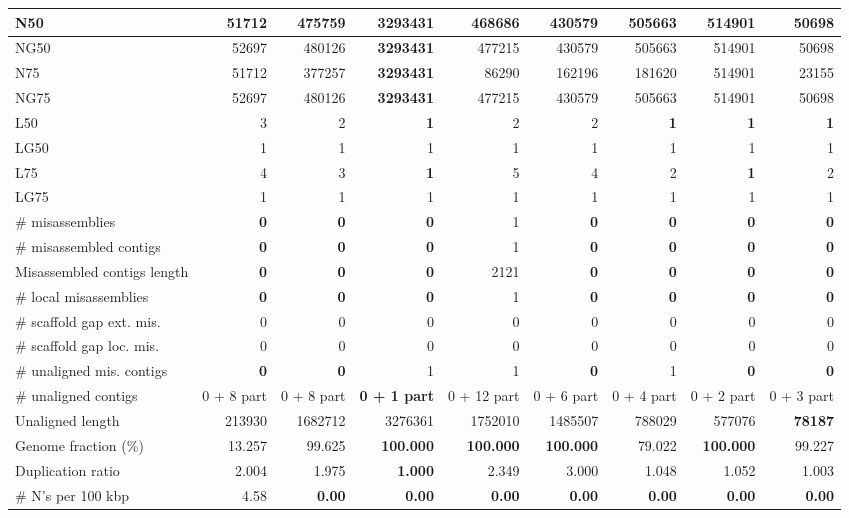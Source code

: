 \documentclass[12pt,a4paper]{article}
\begin{document}
\begin{table}[ht]
\begin{center}
\begin{tabular}{|l*{8}{|r}|}
N50 & 51712 & 475759 & {\bf 3293431} & 468686 & 430579 & 505663 & 514901 & 50698 \\ \hline
NG50 & 52697 & 480126 & {\bf 3293431} & 477215 & 430579 & 505663 & 514901 & 50698 \\ \hline
N75 & 51712 & 377257 & {\bf 3293431} & 86290 & 162196 & 181620 & 514901 & 23155 \\ \hline
NG75 & 52697 & 480126 & {\bf 3293431} & 477215 & 430579 & 505663 & 514901 & 50698 \\ \hline
L50 & 3 & 2 & {\bf 1} & 2 & 2 & {\bf 1} & {\bf 1} & {\bf 1} \\ \hline
LG50 & 1 & 1 & 1 & 1 & 1 & 1 & 1 & 1 \\ \hline
L75 & 4 & 3 & {\bf 1} & 5 & 4 & 2 & {\bf 1} & 2 \\ \hline
LG75 & 1 & 1 & 1 & 1 & 1 & 1 & 1 & 1 \\ \hline
\# misassemblies & {\bf 0} & {\bf 0} & {\bf 0} & 1 & {\bf 0} & {\bf 0} & {\bf 0} & {\bf 0} \\ \hline
\# misassembled contigs & {\bf 0} & {\bf 0} & {\bf 0} & 1 & {\bf 0} & {\bf 0} & {\bf 0} & {\bf 0} \\ \hline
Misassembled contigs length & {\bf 0} & {\bf 0} & {\bf 0} & 2121 & {\bf 0} & {\bf 0} & {\bf 0} & {\bf 0} \\ \hline
\# local misassemblies & {\bf 0} & {\bf 0} & {\bf 0} & 1 & {\bf 0} & {\bf 0} & {\bf 0} & {\bf 0} \\ \hline
\# scaffold gap ext. mis. & 0 & 0 & 0 & 0 & 0 & 0 & 0 & 0 \\ \hline
\# scaffold gap loc. mis. & 0 & 0 & 0 & 0 & 0 & 0 & 0 & 0 \\ \hline
\# unaligned mis. contigs & {\bf 0} & {\bf 0} & 1 & 1 & {\bf 0} & 1 & {\bf 0} & {\bf 0} \\ \hline
\# unaligned contigs & 0 + 8 part & 0 + 8 part & {\bf 0 + 1 part} & 0 + 12 part & 0 + 6 part & 0 + 4 part & 0 + 2 part & 0 + 3 part \\ \hline
Unaligned length & 213930 & 1682712 & 3276361 & 1752010 & 1485507 & 788029 & 577076 & {\bf 78187} \\ \hline
Genome fraction (\%) & 13.257 & 99.625 & {\bf 100.000} & {\bf 100.000} & {\bf 100.000} & 79.022 & {\bf 100.000} & 99.227 \\ \hline
Duplication ratio & 2.004 & 1.975 & {\bf 1.000} & 2.349 & 3.000 & 1.048 & 1.052 & 1.003 \\ \hline
\# N's per 100 kbp & 4.58 & {\bf 0.00} & {\bf 0.00} & {\bf 0.00} & {\bf 0.00} & {\bf 0.00} & {\bf 0.00} & {\bf 0.00} \\ \hline

\end{tabular}
\end{center}
\end{table}
\end{document}
